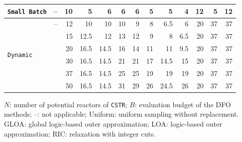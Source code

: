 \begin{table}[htbp]
\begin{threeparttable}
\begin{tabular}{@{}lrrrrrrrrrrrr@{}}
\midrule
\texttt{Small Batch} & -- & 10 & 5 & 6 & 6 & 6 & 5 & 5 & 4 & 12 & 5 & 12 \\
\midrule
\multirow{6}{*}{\texttt{Dynamic}} & -- & 12 & 10 & 10 & 10 & 9 & 8 & 6.5 & 6 & 20 & 37 & 37 \\
 &  & 15 & 12.5 & 12 & 13 & 12 & 9 & 8 & 6.5 & 20 & 37 & 37 \\
 &  & 20 & 16.5 & 14.5 & 16 & 14 & 11 & 11 & 9.5 & 20 & 37 & 37 \\
 &  & 30 & 16.5 & 14.5 & 21 & 21 & 17 & 14.5 & 15 & 20 & 37 & 37 \\
 &  & 37 & 16.5 & 14.5 & 25 & 25 & 19 & 19 & 19 & 20 & 37 & 37 \\
 &  & 50 & 16.5 & 14.5 & 31 & 29 & 26 & 24.5 & 26 & 20 & 37 & 37 \\
\bottomrule
\end{tabular}
\begin{tablenotes}[flushleft]\footnotesize
\item \(N\): number of potential reactors of \texttt{CSTR}; \(B\): evaluation budget of the DFO methods; --: not applicable; Uniform: uniform sampling without replacement.
GLOA: global logic-based outer approximation; LOA: logic-based outer approximation; RIC: relaxation with integer cuts.
\end{tablenotes}
\end{threeparttable}
\end{table}
\FloatBarrier

